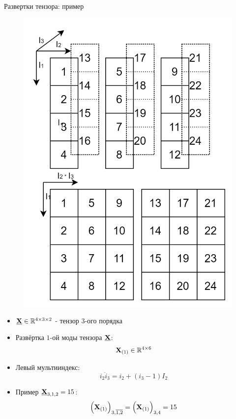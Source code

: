 \begin{frame}{Развертки тензора: пример}

\begin{minipage}{0.4\textwidth}
\begin{figure}
    \centering
    \includegraphics[width=\textwidth]{lecture_11/figs/matricization_example.png}
\end{figure}
\end{minipage}%
\hfill%
\begin{minipage}{0.6\textwidth}%
\begin{itemize}
\item $\underline{\textbf{X}} \in \mathbb{R}^{4 \times 3 \times 2}$ - тензор $3$-ого порядка
\item Развёртка $1$-ой моды тензора $\underline{\textbf{X}}$:
$$\textbf{X}_{(1)} \in \mathbb{R}^{4 \times 6} $$
\item Левый мультииндекс:
$$ \overline{i_2 i_3} = i_2 + (i_3 - 1)I_2$$
\item Пример $\underline{\textbf{X}}_{3,1,2} = 15$:
$$\Big(\textbf{X}_{(1)}\Big)_{3, \overline{1, 2}} = \Big(\textbf{X}_{(1)}\Big)_{3, 4} = 15$$
\end{itemize}
\end{minipage}


\end{frame}
